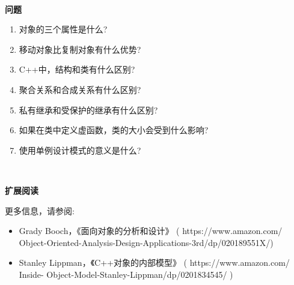 \noindent\textbf{}\ \par
\textbf{问题} \ \par
\begin{enumerate}
	\item 对象的三个属性是什么?
	\item 移动对象比复制对象有什么优势?
	\item C++中，结构和类有什么区别?
	\item 聚合关系和合成关系有什么区别?
	\item 私有继承和受保护的继承有什么区别?
	\item 如果在类中定义虚函数，类的大小会受到什么影响?
	\item 使用单例设计模式的意义是什么?
\end{enumerate}

\noindent\textbf{}\ \par
\textbf{扩展阅读} \ \par
更多信息，请参阅: \par

\begin{itemize}
	\item Grady Booch，《面向对象的分析和设计》 ( https:/​/​www.​amazon.​com/	Object-​Oriented-​Analysis-​Design-​Applications-​3rd/​dp/​020189551X/​ )
	\item Stanley Lippman，《C++对象的内部模型》 ( https:/​/​www.​amazon.​com/​Inside-	Object-​Model-​Stanley-​Lippman/​dp/​0201834545/​ )
\end{itemize}

\newpage



















